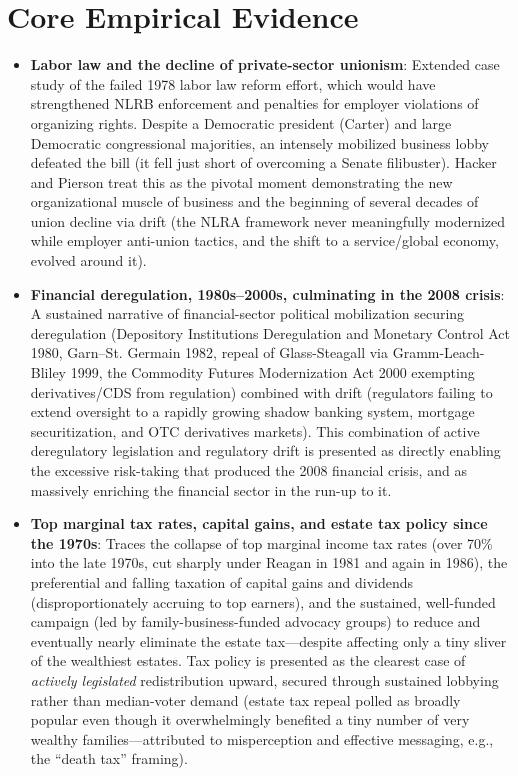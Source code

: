 \documentclass[12pt]{article}
\begin{document}
\section{Core Empirical Evidence}

\begin{itemize}[leftmargin=*, itemsep=4pt]
    \item \textbf{Labor law and the decline of private-sector unionism}: Extended case study of the failed 1978 labor law reform effort, which would have strengthened NLRB enforcement and penalties for employer violations of organizing rights. Despite a Democratic president (Carter) and large Democratic congressional majorities, an intensely mobilized business lobby defeated the bill (it fell just short of overcoming a Senate filibuster). Hacker and Pierson treat this as the pivotal moment demonstrating the new organizational muscle of business and the beginning of several decades of union decline via drift (the NLRA framework never meaningfully modernized while employer anti-union tactics, and the shift to a service/global economy, evolved around it).
    \item \textbf{Financial deregulation, 1980s--2000s, culminating in the 2008 crisis}: A sustained narrative of financial-sector political mobilization securing deregulation (Depository Institutions Deregulation and Monetary Control Act 1980, Garn--St. Germain 1982, repeal of Glass-Steagall via Gramm-Leach-Bliley 1999, the Commodity Futures Modernization Act 2000 exempting derivatives/CDS from regulation) combined with drift (regulators failing to extend oversight to a rapidly growing shadow banking system, mortgage securitization, and OTC derivatives markets). This combination of active deregulatory legislation and regulatory drift is presented as directly enabling the excessive risk-taking that produced the 2008 financial crisis, and as massively enriching the financial sector in the run-up to it.
    \item \textbf{Top marginal tax rates, capital gains, and estate tax policy since the 1970s}: Traces the collapse of top marginal income tax rates (over 70\% into the late 1970s, cut sharply under Reagan in 1981 and again in 1986), the preferential and falling taxation of capital gains and dividends (disproportionately accruing to top earners), and the sustained, well-funded campaign (led by family-business-funded advocacy groups) to reduce and eventually nearly eliminate the estate tax---despite affecting only a tiny sliver of the wealthiest estates. Tax policy is presented as the clearest case of \emph{actively legislated} redistribution upward, secured through sustained lobbying rather than median-voter demand (estate tax repeal polled as broadly popular even though it overwhelmingly benefited a tiny number of very wealthy families---attributed to misperception and effective messaging, e.g., the ``death tax'' framing).

\end{itemize}
\end{document}
